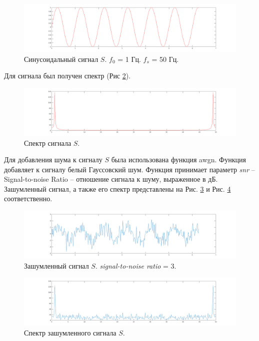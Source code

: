 \documentclass[a4paper,14pt]{extarticle}
\begin{document}
\begin{figure}[H]
\centering
\includegraphics[scale=0.38]{pics/3clear_sin.png}
\caption{Синусоидальный сигнал $S$. $f_0$ = 1 Гц. $f_s$ = 50 Гц.}
\label{clear_sin}
\end{figure}

Для сигнала был получен спектр (Рис \ref{clear_spec}).
\begin{figure}[H]
\centering
\includegraphics[scale=0.38]{pics/3clear_sin_spec.png}
\caption{Спектр сигнала $S$.}
\label{clear_spec}
\end{figure}

Для добавления шума к сигналу $S$ была использована функция awgn. Функция добавляет к сигналу белый Гауссовский шум. Функция принимает параметр \textit{snr} -- Signal-to-noise Ratio -- отношение сигнала к шуму, выраженное в дБ.  Зашумленный сигнал, а также его спектр представлены на Рис. \ref{noise_sin} и Рис. \ref{noise_sin_spec} соответственно.

\begin{figure}[H]
\centering
\includegraphics[scale=0.38]{pics/3noise_sin.png}
\caption{Зашумленный сигнал $S$. \textit{signal-to-noise ratio} = 3.}
\label{noise_sin}
\end{figure}

\begin{figure}[H]
\centering
\includegraphics[scale=0.38]{pics/3noise_sin_spec.png}
\caption{Спектр зашумленного сигнала $S$.}
\label{noise_sin_spec}
\end{figure}
\end{document}
